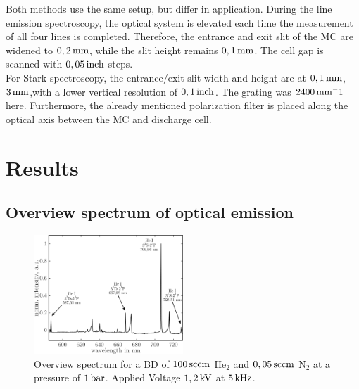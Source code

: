 \documentclass[a4paper,10pt,twoside]{article}
\begin{document}
			Both methods use the same setup, but differ in application. During the line emission spectroscopy, the optical system is elevated each time the measurement of all four lines is completed. Therefore, the entrance and exit slit of the MC are widened to $\unit[0,2]{mm}$, while the slit height remains $\unit[0,1]{mm}$. The cell gap is scanned with $\unit[0,05]{inch}$ steps.\\
			For Stark spectroscopy, the entrance/exit slit width and height are at $\unit[0,1]{mm}$, $\unit[3]{mm}$,with a lower vertical resolution of $\unit[0,1]{inch}$. The grating was $\unit[2400]{mm^-1}$ here. Furthermore, the already mentioned polarization filter is placed along the optical axis between the MC and discharge cell.

	\section{Results}

		\subsection{Overview spectrum of optical \newline emission}\label{subsec:overview}
			
				\begin{figure}[b!]
					\centering
					\hspace{-0.5cm}\includegraphics[width=0.5\textwidth]{figures/results/int_spectrum}
					\caption{Overview spectrum for a BD of $\unit[100]{sccm}$ He$_2$ and $\unit[0,05]{sccm}$ N$_2$ at a pressure of $\unit[1]{bar}$. Applied Voltage $\unit[1,2]{kV}$ at $\unit[5]{kHz}$.}
					\label{img:intspec}
				\end{figure}
		
\end{document}
